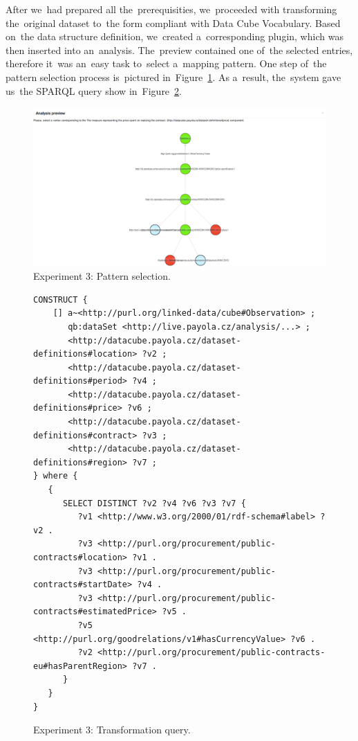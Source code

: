 After we~had prepared all the~prerequisities, we~proceeded with transforming the~original dataset to~the form compliant with Data Cube Vocabulary. Based on~the 
data structure definition, we~created a~corresponding plugin, which was then 
inserted into an~analysis. The~preview contained one of~the selected entries, 
therefore it~was an~easy task to~select a~mapping pattern. One step of~the 
pattern selection process is~pictured in~Figure~\ref{fig:contracts-pattern}.
As a~result, the~system gave us~the SPARQL query show in~Figure~\ref{fig:contracts-query-pattern}.

\begin{figure}
  \centering
  \includegraphics[width=140mm]{img/contracts-pattern.png}
  \caption{Experiment 3: Pattern selection.}
  \label{fig:contracts-pattern}
\end{figure}

\begin{figure}
  \scriptsize
  \begin{verbatim}
CONSTRUCT {
    [] a~<http://purl.org/linked-data/cube#Observation> ;
       qb:dataSet <http://live.payola.cz/analysis/...> ;
       <http://datacube.payola.cz/dataset-definitions#location> ?v2 ;
       <http://datacube.payola.cz/dataset-definitions#period> ?v4 ;
       <http://datacube.payola.cz/dataset-definitions#price> ?v6 ;
       <http://datacube.payola.cz/dataset-definitions#contract> ?v3 ;
       <http://datacube.payola.cz/dataset-definitions#region> ?v7 ;
} where {
   {
      SELECT DISTINCT ?v2 ?v4 ?v6 ?v3 ?v7 {
         ?v1 <http://www.w3.org/2000/01/rdf-schema#label> ?v2 .
         ?v3 <http://purl.org/procurement/public-contracts#location> ?v1 .
         ?v3 <http://purl.org/procurement/public-contracts#startDate> ?v4 .
         ?v3 <http://purl.org/procurement/public-contracts#estimatedPrice> ?v5 .
         ?v5 <http://purl.org/goodrelations/v1#hasCurrencyValue> ?v6 .
         ?v2 <http://purl.org/procurement/public-contracts-eu#hasParentRegion> ?v7 .
      }
   }
} 
  \end{verbatim}
  \caption{Experiment 3: Transformation query.}
  \label{fig:contracts-query-pattern}
\end{figure}

